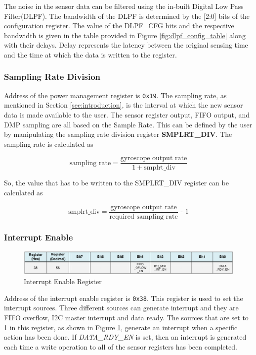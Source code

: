 \documentclass{article}
\begin{document}
	The noise in the sensor data can be filtered using the in-built Digital Low Pass Filter(DLPF). The bandwidth of the DLPF is determined by the [2:0] bits of the configuration register. The value of the DLPF\_CFG bits and the respective bandwidth is given in the table provided in Figure \ref{fig:dlpf_config_table} along with their delays. Delay represents the latency between the original sensing time and the time at which the data is written to the register.
	

	\subsubsection{Sampling Rate Division}
	\label{sec:smplrt_div}
	Address of the power management register is \texttt{0x19}. The sampling rate, as mentioned in Section \ref{sec:introduction}, is the interval at which the new sensor data is made available to the user. The sensor register output, FIFO output, and DMP sampling are all based on the Sample Rate\cite{mpu6050-register-map}. This can be defined by the user by manipulating the sampling rate division register \textbf{SMPLRT\_DIV}. The sampling rate is calculated as
	
	$$ \text{sampling rate} = \frac{\text{gyroscope output rate}}{1 + \text{smplrt\_div}} $$
	
	So, the value that has to be written to the SMPLRT\_DIV register can be calculated as 
	
	$$ \text{smplrt\_div} = \frac{\text{gyroscope output rate}}{\text{required sampling rate}} \text{ - 1} $$
    
    \subsubsection{Interrupt Enable}
    
    \begin{figure}[h]
    	\centering
    	\includegraphics[width=\textwidth]{figs/reg_int_enable.png}
    	\caption{Interrupt Enable Register\cite{mpu6050-register-map}}
    	\label{fig:int_en_reg}
    \end{figure}

    Address of the interrupt enable register is \texttt{0x38}. This register is used to set the interrupt sources. Three different sources can generate interrupt and they are FIFO overflow, I2C master interrupt and data ready. The sources that are set to 1 in this register, as shown in Figure \ref{fig:int_en_reg}, generate an interrupt when a specific action has been done. If \textit{DATA\_RDY\_EN} is set, then an interrupt is generated each time a write operation to all of the sensor registers has been completed\cite{mpu6050-register-map}.
    
\end{document}

